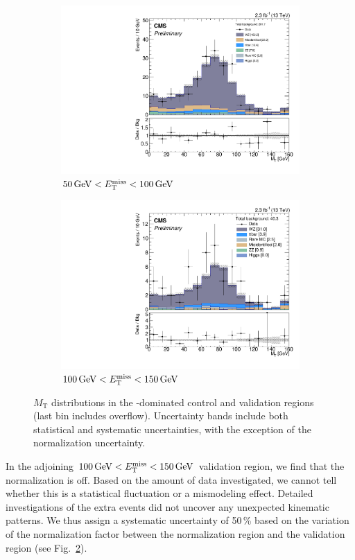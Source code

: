 \begin{figure}
\begin{center}
	\begin{subfigure}[b]{.7\textwidth}
		\includegraphics[width=\textwidth]{Background/bkg_WZ/WZ_MET50to100_MT}
		\caption{$50\,\text{Ge\hspace{-.08em}V} < E_{\mathrm{T}}^{\text{miss}} < 100\,\text{Ge\hspace{-.08em}V}$} \label{fig:WZ/MET50to100_MT}
	\end{subfigure}
	\begin{subfigure}[b]{.7\textwidth}
		\includegraphics[width=\textwidth]{Background/bkg_WZ/WZ_MET100to150_MT}
		\caption{$100\,\text{Ge\hspace{-.08em}V} < E_{\mathrm{T}}^{\text{miss}} < 150\,\text{Ge\hspace{-.08em}V}$ } \label{fig:WZ/MET100to150_MT}
	\end{subfigure}
	\caption{$M_\textrm{T}$ distributions in the \WZ-dominated control and validation regions (last bin includes overflow). Uncertainty bands include both statistical and systematic uncertainties, with the exception of the \WZ normalization uncertainty.
	\label{fig:WZ}}
\end{center}
\end{figure}

In the adjoining $100\,\text{Ge\hspace{-.08em}V} < E_{\mathrm{T}}^{\text{miss}} < 150\,\text{Ge\hspace{-.08em}V}$ validation region, we find that the normalization is off. Based on the amount of data investigated, we cannot tell whether this is a statistical fluctuation or a mismodeling effect. Detailed investigations of the extra events did not uncover any unexpected kinematic patterns. We thus assign a systematic uncertainty of 50\,\% based on the variation of the normalization factor between the normalization region and the validation region (see Fig.~\ref{fig:WZ/MET100to150_MT}).
